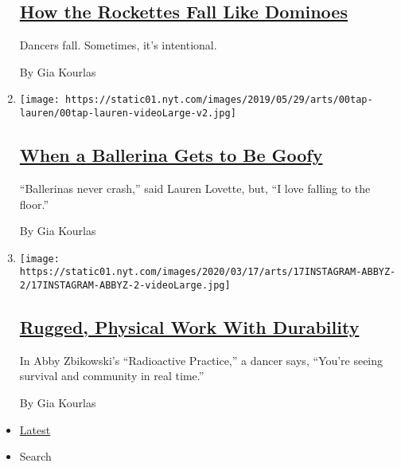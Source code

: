 \begin{enumerate}
  \hypertarget{how-the-rockettes-fall-like-dominoes}{%
  \subsection{\texorpdfstring{\href{/interactive/2019/05/30/arts/dance/speaking-in-dance-rockettes.html}{How
  the Rockettes Fall Like
  Dominoes}}{How the Rockettes Fall Like Dominoes}}\label{how-the-rockettes-fall-like-dominoes}}

  Dancers fall. Sometimes, it's intentional.

  By Gia Kourlas
\item
  \texttt{[image: https://static01.nyt.com/images/2019/05/29/arts/00tap-lauren/00tap-lauren-videoLarge-v2.jpg]}

  \hypertarget{when-a-ballerina-gets-to-be-goofy}{%
  \subsection{\texorpdfstring{\href{/interactive/2019/05/30/arts/dance/speaking-in-dance-lauren-lovette.html}{When
  a Ballerina Gets to Be
  Goofy}}{When a Ballerina Gets to Be Goofy}}\label{when-a-ballerina-gets-to-be-goofy}}

  ``Ballerinas never crash,'' said Lauren Lovette, but, ``I love falling
  to the floor.''

  By Gia Kourlas
\item
  \texttt{[image: https://static01.nyt.com/images/2020/03/17/arts/17INSTAGRAM-ABBYZ-2/17INSTAGRAM-ABBYZ-2-videoLarge.jpg]}

  \hypertarget{rugged-physical-work-with-durability}{%
  \subsection{\texorpdfstring{\href{/2020/03/19/arts/dance/abby-zbikowski-radioactive-practice.html}{Rugged,
  Physical Work With
  Durability}}{Rugged, Physical Work With Durability}}\label{rugged-physical-work-with-durability}}

  In Abby Zbikowski's ``Radioactive Practice,'' a dancer says, ``You're
  seeing survival and community in real time.''

  By Gia Kourlas
\end{enumerate}

\begin{itemize}
\tightlist
\item
  \protect\hyperlink{stream-panel}{Latest}
\item
  Search
\end{itemize}

